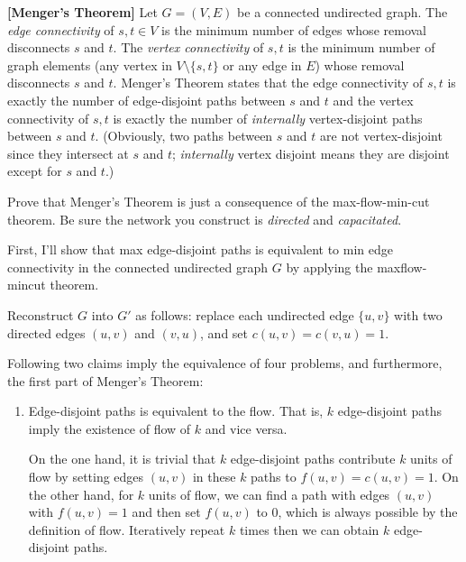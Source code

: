 \documentclass{oxmathproblems}
\begin{document}
\begin{questions}

\miquestion[30] \textbf{[Menger's Theorem]}
Let $G=(V,E)$ be a connected undirected graph. The \emph{edge connectivity} of $s,t\in V$ is the minimum number of edges whose removal disconnects $s$ and $t$.
The \emph{vertex connectivity} of $s,t$ is the minimum number of graph elements (any vertex in $V\setminus\{s,t\}$ or any edge in $E$) whose removal disconnects $s$ and $t$. Menger's Theorem states that the edge connectivity of $s,t$ is exactly the number of edge-disjoint paths between $s$ and $t$ and the vertex connectivity of $s,t$ is exactly the number of \emph{internally} vertex-disjoint paths between $s$ and $t$. (Obviously, two paths between $s$ and $t$ are not vertex-disjoint since they intersect at $s$ and $t$; \emph{internally} vertex disjoint means they are disjoint except for $s$ and $t$.)

Prove that Menger's Theorem is just a consequence of the max-flow-min-cut theorem. Be sure the network you construct is \emph{directed} and \emph{capacitated}.

\vspace{0.5cm}
\begin{Solution}
    
First, I'll show that max edge-disjoint paths is equivalent to min edge connectivity in the connected undirected graph $G$ by applying the maxflow-mincut theorem.

Reconstruct $G$ into $G'$ as follows: replace each undirected edge $\{u, v\}$ with two directed edges $(u, v)$ and $(v, u)$, and set $c(u, v)=c(v, u)=1$. 

Following two claims imply the equivalence of four problems, and furthermore, the first part of Menger's Theorem:

\begin{enumerate}
    \item Edge-disjoint paths is equivalent to the flow. That is, $k$ edge-disjoint paths imply the existence of flow of $k$ and vice versa.
    
    On the one hand, it is trivial that $k$ edge-disjoint paths contribute $k$ units of flow by setting edges $(u, v)$ in these $k$ paths to $f(u, v)=c(u, v)=1$. On the other hand, for $k$ units of flow, we can find a path with edges $(u, v)$ with $f(u, v)=1$ and then set $f(u, v)$ to $0$, which is always possible by the definition of flow. Iteratively repeat $k$ times then we can obtain $k$ edge-disjoint paths.


\end{enumerate}
\end{Solution}
\end{questions}
\end{document}
